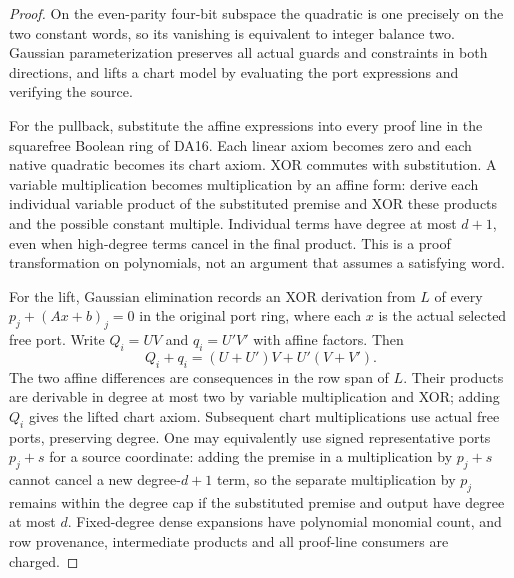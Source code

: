 \documentclass[11pt]{article}
\begin{document}
\begin{proof}
On the even-parity four-bit subspace the quadratic is one precisely on the two constant words, so its vanishing is equivalent to integer balance two. Gaussian parameterization preserves all actual guards and constraints in both directions, and lifts a chart model by evaluating the port expressions and verifying the source.

For the pullback, substitute the affine expressions into every proof line in the squarefree Boolean ring of DA16. Each linear axiom becomes zero and each native quadratic becomes its chart axiom. XOR commutes with substitution. A variable multiplication becomes multiplication by an affine form: derive each individual variable product of the substituted premise and XOR these products and the possible constant multiple. Individual terms have degree at most $d+1$, even when high-degree terms cancel in the final product. This is a proof transformation on polynomials, not an argument that assumes a satisfying word.

For the lift, Gaussian elimination records an XOR derivation from $L$ of every $p_j+(Ax+b)_j=0$ in the original port ring, where each $x$ is the actual selected free port. Write $Q_i=UV$ and $q_i=U'V'$ with affine factors. Then
\[
 Q_i+q_i=(U+U')V+U'(V+V').
\]
The two affine differences are consequences in the row span of $L$. Their products are derivable in degree at most two by variable multiplication and XOR; adding $Q_i$ gives the lifted chart axiom. Subsequent chart multiplications use actual free ports, preserving degree. One may equivalently use signed representative ports $p_j+s$ for a source coordinate: adding the premise in a multiplication by $p_j+s$ cannot cancel a new degree-$d+1$ term, so the separate multiplication by $p_j$ remains within the degree cap if the substituted premise and output have degree at most $d$. Fixed-degree dense expansions have polynomial monomial count, and row provenance, intermediate products and all proof-line consumers are charged.
\end{proof}
\end{document}
